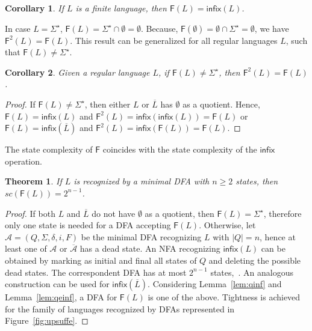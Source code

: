 \documentclass{article}
\newtheorem{theorem}{Theorem}
\newtheorem{corollary}{Corollary}
\newcommand{\dfa}{DFA\xspace}
\newcommand{\nfa}{NFA\xspace}
\newcommand{\dfas}{DFAs\xspace}
\newcommand{\comp}[1]{\overline{#1}}
\newcommand{\inff}[1]{\mathsf{infix}(#1)}
\newcommand{\inffo}{\mathsf{infix}}
\newcommand{\dinf}[1]{\mathsf{F}(#1)}
\newcommand{\dinfo}{\mathsf{F}}
\newcommand{\dinfn}[2]{\mathsf{F}^{#2}(#1)}
\begin{document}
\begin{corollary}
\label{cor:dinffinite}
  If $L$ is a finite language, then $\dinf{L}=\inff{L}$.
\end{corollary}

In case $L=\Sigma^\star$, $\dinf{L}=\Sigma^\star\cap \emptyset=\emptyset$. Because,
$\dinf{\emptyset}= \emptyset\cap\Sigma^\star=\emptyset$, we have $\dinfn{L}{2}=\dinf{L}$.
This result can be generalized for all regular languages $L$, such that $\dinf{L}\neq\Sigma^\star$.

\begin{corollary}
\label{cor:f2f}
Given  a regular language $L$, if $\dinf{L}\neq\Sigma^\star$, then $\dinfn{L}{2}=\dinf{L}$. 
\end{corollary}
\begin{proof}
If $\dinf{L}\neq\Sigma^\star$, then either $L$ or $\comp{L}$ has $\emptyset$ as a quotient.
Hence,   $\dinf{L}=\inff{L}$ and $\dinfn{L}{2}=\inff{\inff{L}}=\dinf{L}$ or
 $\dinf{L}=\inff{\comp{L}}$ and  $\dinfn{L}{2}=\inff{\dinf{L}}=\dinf{L}$.
\end{proof}



The state complexity of $\dinfo$ coincides with the state complexity of the $\inffo$ operation.

\begin{theorem}
\label{theo:scdinf}
If $L$ is recognized by a minimal \dfa with $n\geq 2$ states, then
$sc(\dinf{L})=2^{n-1}$.
\end{theorem}

\begin{proof}
 If both $L$ and $\comp{L}$ do not have $\emptyset$ as a quotient, then $\dinf{L}=\Sigma^\star$, 
therefore only one state is needed for a \dfa accepting $\dinf{L}$. 
Otherwise, let $\mathcal{A}=(Q,\Sigma,\delta,i,F)$ be the minimal \dfa recognizing $L$ with $|Q|=n$, 
hence at least one of $\mathcal{A}$ or $\comp{\mathcal{A}}$ has a dead state.
An \nfa recognizing $\inff{L}$ can be obtained by marking as initial and final all states of $Q$ and deleting the possible dead states.
The correspondent \dfa has at most $2^{n-1}$ states,~\cite{brzozowski14:_quotien_compl_of_closed_languag}. 
An analogous construction can be used for $\inff{\comp{L}}$. 
Considering Lemma~\ref{lem:qinf} and Lemma~\ref{lem:qeinf}, a \dfa for $\dinf{L}$ is one of the above. 
Tightness is achieved for the family of languages recognized by \dfas represented in Figure~\ref{fig:upsuffe}.
\end{proof}
\end{document}
